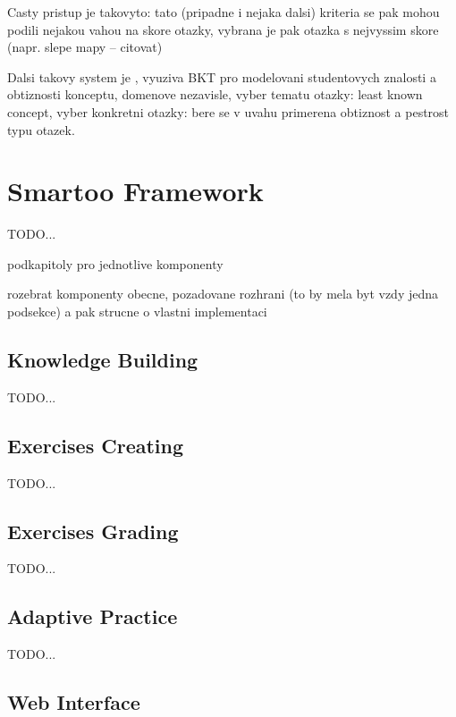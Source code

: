 \documentclass[a4paper, 12pt, twoside]{fithesis2}		%
\renewcommand{\_}{\leavevmode \kern0.0em\vbox{\hrule width0.4em}}
\begin{document}
Casty pristup je takovyto: tato (pripadne i nejaka dalsi) kriteria se pak mohou podili nejakou vahou na skore otazky, vybrana je pak otazka s nejvyssim skore (napr. slepe mapy -- citovat)

Dalsi takovy system je
\cite{question-gen-adapt-bayes}, vyuziva BKT pro modelovani studentovych znalosti a obtiznosti konceptu,  domenove nezavisle, vyber tematu otazky: least known concept, vyber konkretni otazky: bere se v uvahu primerena obtiznost a pestrost typu otazek.




\chapter{Smartoo Framework}
\label{chap:smartoo}

TODO...

podkapitoly pro jednotlive komponenty

rozebrat komponenty obecne, pozadovane rozhrani (to by mela byt vzdy jedna podsekce) a pak strucne o vlastni implementaci

\section{Knowledge Building}
\label{sec:smartoo-knowledge}

TODO...

\section{Exercises Creating}
\label{sec:smartoo-exercises}

TODO...

\section{Exercises Grading}
\label{sec:smartoo-exercises-grading}

TODO...

\section{Adaptive Practice}
\label{sec:smartoo-practice}


TODO...

\section{Web Interface}
\label{sec:smartoo-web}
\end{document}
